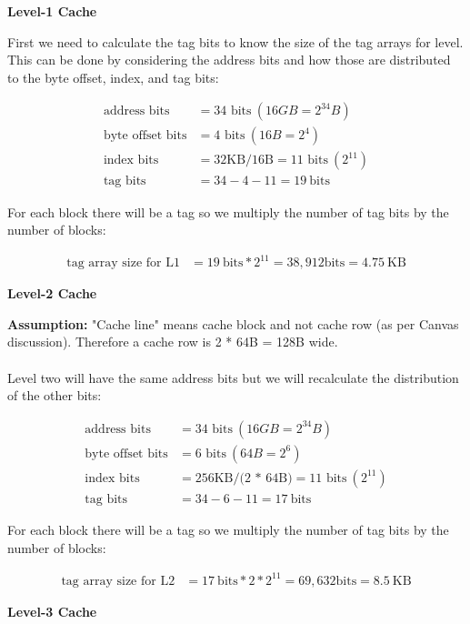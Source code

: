 \documentclass[a4paper, 11pt]{exam}
\begin{document}
\begin{enumerate}
\textbf{Level-1 Cache}

First we need to calculate the tag bits to know the size of the tag arrays for level. This can be done by considering the address bits and how those are distributed to the byte offset, index, and tag bits:

\begin{align*}
\text{address bits} &= \text{34 bits} \  (16GB = 2^{34} B) \\
\text{byte offset bits} &= \text{4 bits} \ (16B = 2^4) \\
\text{index bits} &= \text{32KB/16B} = \text{11 bits} \ (2^{11})\\
\text{tag bits} &= 34 - 4 - 11 = 19 \ \text{bits}         
\end{align*}

For each block there will be a tag so we multiply the number of tag bits by the number of blocks:

\begin{align*}
\text{tag array size for L1} &= 19 \ \text{bits} * 2^{11} = 38, 912 \text{bits} = 4.75 \ \text{KB} 	
\end{align*}

\textbf{Level-2 Cache}

\textbf{Assumption:} "Cache line" means cache block and not cache row (as per Canvas discussion). Therefore a cache row is 2 * 64B = 128B wide.\\ \\
Level two will have the same address bits but we will recalculate the distribution of the other bits:

\begin{align*}
\text{address bits} &= \text{34 bits} \  (16GB = 2^{34} B) \\
\text{byte offset bits} &= \text{6 bits} \ (64B = 2^6) \\
\text{index bits} &= \text{256KB/(2 * 64B)} = \text{11 bits} \ (2^{11})\\
\text{tag bits} &= 34 - 6 - 11 =  17 \ \text{bits}         
\end{align*}

For each block there will be a tag so we multiply the number of tag bits by the number of blocks:

\begin{align*}
\text{tag array size for L2} &= 17 \ \text{bits} * 2 * 2^{11} = 69,632 \text{bits} = 8.5 \ \text{KB} 	
\end{align*}

\textbf{Level-3 Cache}


\end{enumerate}
\end{document}
